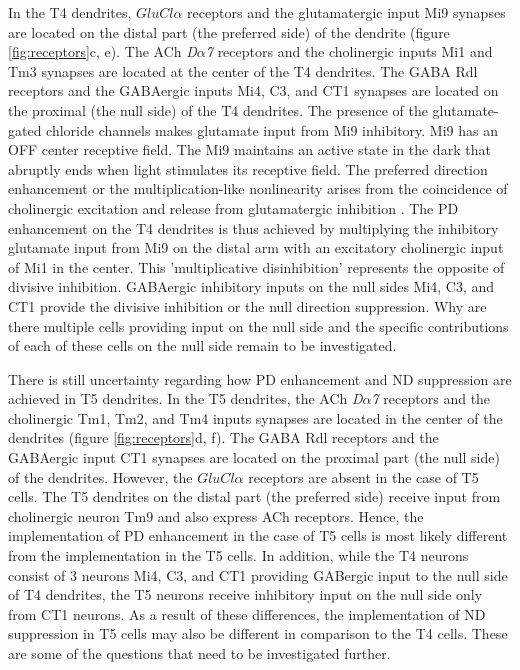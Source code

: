 In the T4 dendrites, \textit{$GluCl\alpha$} receptors and the glutamatergic input Mi9 synapses are located on the distal part (the preferred side) of the dendrite (figure \ref{fig:receptors}c, e). The ACh \textit{D$\alpha$7} receptors and the cholinergic inputs Mi1 and Tm3 synapses are located at the center of the T4 dendrites. The GABA Rdl receptors and the GABAergic inputs Mi4, C3, and CT1 synapses are located on the proximal (the null side) of the T4 dendrites. The presence of the glutamate-gated chloride channels makes glutamate input from Mi9 inhibitory. Mi9 has an OFF center receptive field. The Mi9 maintains an active state in the dark that abruptly ends when light stimulates its receptive field. The preferred direction enhancement or the multiplication-like nonlinearity arises from the coincidence of cholinergic excitation and release from glutamatergic inhibition \parencite{Groschner2022}. The PD enhancement on the T4 dendrites is thus achieved by multiplying the inhibitory glutamate input from Mi9 on the distal arm with an excitatory cholinergic input of Mi1 in the center. This 'multiplicative disinhibition' represents the opposite of divisive inhibition. GABAergic inhibitory inputs on the null sides Mi4, C3, and CT1 provide the divisive inhibition or the null direction suppression. Why are there multiple cells providing input on the null side and the specific contributions of each of these cells on the null side remain to be investigated.

There is still uncertainty regarding how PD enhancement and ND suppression are achieved in T5 dendrites. In the T5 dendrites, the ACh \textit{D$\alpha$7} receptors and the cholinergic Tm1, Tm2, and Tm4 inputs synapses are located in the center of the dendrites (figure \ref{fig:receptors}d, f). The GABA Rdl receptors and the GABAergic input CT1 synapses are located on the proximal part (the null side) of the dendrites. However, the \textit{$GluCl\alpha$} receptors are absent in the case of T5 cells. The T5 dendrites on the distal part (the preferred side) receive input from cholinergic neuron Tm9 and also express ACh receptors. Hence, the implementation of PD enhancement in the case of T5 cells is most likely different from the implementation in the T5 cells. In addition, while the T4 neurons consist of 3 neurons Mi4, C3, and CT1 providing GABergic input to the null side of T4 dendrites, the T5 neurons receive inhibitory input on the null side only from CT1 neurons. As a result of these differences, the implementation of ND suppression in T5 cells may also be different in comparison to the T4 cells. These are some of the questions that need to be investigated further. 

